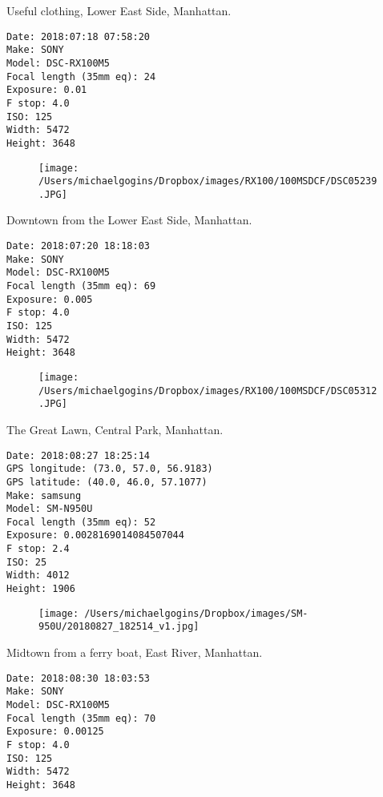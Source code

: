 \documentclass[11pt,letter,DIV=14,paper=landscape]{scrbook}
\begin{document}
\clearpage
\noindent Useful clothing, Lower East Side, Manhattan.
\noindent
\begin{lstlisting}
Date: 2018:07:18 07:58:20
Make: SONY
Model: DSC-RX100M5
Focal length (35mm eq): 24
Exposure: 0.01
F stop: 4.0
ISO: 125
Width: 5472
Height: 3648
\end{lstlisting}
\clearpage

\begin{figure}
\texttt{[image: /Users/michaelgogins/Dropbox/images/RX100/100MSDCF/DSC05239.JPG]}
\end{figure}
    
\clearpage
\noindent Downtown from the Lower East Side, Manhattan.
\noindent
\begin{lstlisting}
Date: 2018:07:20 18:18:03
Make: SONY
Model: DSC-RX100M5
Focal length (35mm eq): 69
Exposure: 0.005
F stop: 4.0
ISO: 125
Width: 5472
Height: 3648
\end{lstlisting}
\clearpage

\begin{figure}
\texttt{[image: /Users/michaelgogins/Dropbox/images/RX100/100MSDCF/DSC05312.JPG]}
\end{figure}
    
\clearpage
\noindent The Great Lawn, Central Park, Manhattan.
\noindent
\begin{lstlisting}
Date: 2018:08:27 18:25:14
GPS longitude: (73.0, 57.0, 56.9183)
GPS latitude: (40.0, 46.0, 57.1077)
Make: samsung
Model: SM-N950U
Focal length (35mm eq): 52
Exposure: 0.0028169014084507044
F stop: 2.4
ISO: 25
Width: 4012
Height: 1906
\end{lstlisting}
\clearpage

\begin{figure}
\texttt{[image: /Users/michaelgogins/Dropbox/images/SM-950U/20180827\_182514\_v1.jpg]}
\end{figure}
    
\clearpage
\noindent Midtown from a ferry boat, East River, Manhattan.
\noindent
\begin{lstlisting}
Date: 2018:08:30 18:03:53
Make: SONY
Model: DSC-RX100M5
Focal length (35mm eq): 70
Exposure: 0.00125
F stop: 4.0
ISO: 125
Width: 5472
Height: 3648
\end{lstlisting}
\clearpage
\end{document}

